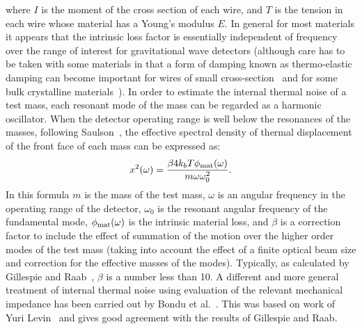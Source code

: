 \documentclass{article}
\begin{document}
%
where $I$ is the moment of the cross section of  each wire, and $T$ is
the tension in each wire whose material has a Young's modulus $E$. In
general for most materials it appears that the intrinsic loss factor
is essentially independent of frequency over the range of interest for
gravitational wave detectors (although care has to be taken with some
materials in that a form of damping known as thermo-elastic damping
can become important for wires of small cross-section~\cite{Nowick}
and for some bulk crystalline materials~\cite{Bragthermo}). In order
to estimate the internal thermal noise of a test mass, each resonant
mode of the mass can be regarded as a harmonic oscillator. When the
detector operating range is well below the resonances of the masses,
following Saulson~\cite{Saulson2}, the effective spectral density of
thermal displacement of the front face of each mass can be expressed as:
%
\begin{equation}
  x^{2}(\omega) = \frac{\beta 4 k_{b} T \phi_{\rm mat}(\omega)}{m
  \omega \omega_{0}^{2}}.
  \label{equation:spectraldensity}
\end{equation}
%
In this formula $m$ is the mass of the test mass, $\omega $ is an
angular frequency in the operating range of the detector, $\omega_{0}$
is the resonant angular frequency of the fundamental mode,
$\phi_{\rm mat}(\omega)$ is the intrinsic material loss, and $\beta$
is a correction factor to include the effect of summation of the
motion over the higher order modes of the test mass (taking into
account the effect of a finite optical beam size and correction for
the effective masses of the modes). Typically, as calculated by
Gillespie and Raab~\cite{Gillespie}, $\beta$ is a number less than
10. A different and more general treatment of internal thermal noise
using evaluation of the relevant mechanical impedance has been carried
out by Bondu et al.~\cite{Bondu}. This was based on work of Yuri
Levin~\cite{Levin} and gives good agreement with the results of
Gillespie and Raab.
\end{document}
